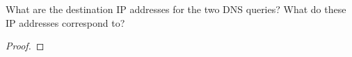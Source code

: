 \documentclass[../../main.tex]{subfiles}
\begin{document}
\begin{wts}
What are the destination IP addresses for the two DNS queries? What do these IP addresses correspond to?
\end{wts}
\begin{proof}

\end{proof}
\end{document}
